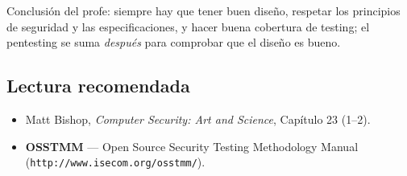 \documentclass[../main.tex]{subfiles}
\begin{document}
\begin{destacado}
Conclusión del profe: siempre hay que tener buen diseño, respetar los principios de seguridad
y las especificaciones, y hacer buena cobertura de testing; el pentesting se suma \emph{después}
para comprobar que el diseño es bueno. 
\end{destacado}

\subsection{Lectura recomendada}

\begin{itemize}
    \item Matt Bishop, \emph{Computer Security: Art and Science}, Capítulo 23 (1--2).
    \item \textbf{OSSTMM} --- Open Source Security Testing Methodology Manual
    (\texttt{http://www.isecom.org/osstmm/}).
\end{itemize}
\end{document}
